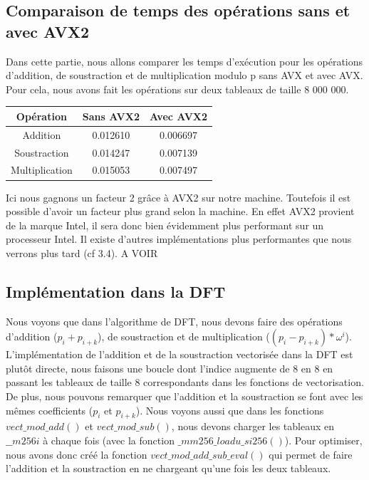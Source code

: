 \documentclass[12pt, a4paper]{article}
\begin{document}
\subsection{Comparaison de temps des opérations sans et avec AVX2}

Dans cette partie, nous allons comparer les temps d'exécution pour les opérations d'addition, de soustraction et de multiplication modulo p sans AVX et avec AVX. Pour cela, nous avons fait les opérations sur deux tableaux de taille 8 000 000.

\begin{center}
\begin{tabular}{||c c c||}
\hline
Opération & Sans AVX2 & Avec AVX2 \\
\hline\hline
Addition & 0.012610 & 0.006697 \\
\hline
Soustraction & 0.014247 & 0.007139 \\
\hline
Multiplication & 0.015053 & 0.007497 \\
\hline
\end{tabular}
\end{center}

Ici nous gagnons un facteur 2 grâce à AVX2 sur notre machine. Toutefois il est possible d'avoir un facteur plus grand selon la machine. En effet AVX2 provient de la marque Intel, il sera donc bien évidemment plus performant sur un processeur Intel. Il existe d'autres implémentations plus performantes que nous verrons plus tard (cf 3.4).  A VOIR

\subsection{Implémentation dans la DFT}

Nous voyons que dans l'algorithme de DFT, nous devons faire des opérations d'addition ($p_i+p_{i+k}$), de soustraction et de multiplication ($(p_i-p_{i+k})*\omega^i$). \\
L'implémentation de l'addition et de la soustraction vectorisée dans la DFT est plutôt directe, nous faisons une boucle dont l'indice augmente de 8 en 8 en passant les tableaux de taille 8 correspondants dans les fonctions de vectorisation. \\
\indent De plus, nous pouvons remarquer que l'addition et la soustraction se font avec les mêmes coefficients ($p_i$ et $p_{i+k}$). Nous voyons aussi que dans les fonctions $vect\_mod\_add()$ et $vect\_mod\_sub()$, nous devons charger les tableaux en $\_\_m256i$ à chaque fois (avec la fonction $\_mm256\_loadu\_si256()$). Pour optimiser, nous avons donc créé la fonction $vect\_mod\_add\_sub\_eval()$ qui permet de faire l'addition et la soustraction en ne chargeant qu'une fois les deux tableaux. \\[0.2cm]
\end{document}
